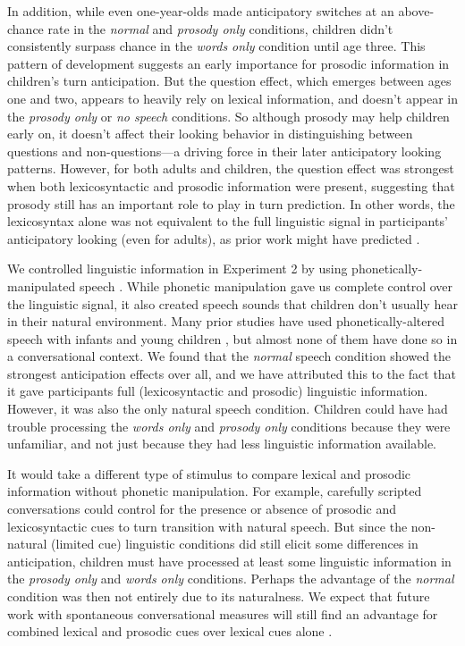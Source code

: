 \documentclass[authoryear, 12pt]{elsarticle}
\begin{document}
In addition, while even one-year-olds made anticipatory switches at an above-chance rate in the \textit{normal} and \textit{prosody only} conditions, children didn't consistently surpass chance in the \textit{words only} condition until age three. This pattern of development suggests an early importance for prosodic information in children's turn anticipation. But the question effect, which emerges between ages one and two, appears to heavily rely on lexical information, and doesn't appear in the \textit{prosody only} or \textit{no speech} conditions. So although prosody may help children early on, it doesn't affect their looking behavior in distinguishing between questions and non-questions---a driving force in their later anticipatory looking patterns. However, for both adults and children, the question effect was strongest when both lexicosyntactic and prosodic information were present, suggesting that prosody still has an important role to play in turn prediction. In other words, the lexicosyntax alone was not equivalent to the full linguistic signal in participants' anticipatory looking (even for adults), as prior work might have predicted \citep{de-ruiter2006, magyari2012}.

We controlled linguistic information in Experiment 2 by using phonetically-manipulated speech \citep{de-ruiter2006}. While phonetic manipulation gave us complete control over the linguistic signal, it also created speech sounds that children don't usually hear in their natural environment. Many prior studies have used phonetically-altered speech with infants and young children \citep[cf.][]{jusczyk2000}, but almost none of them have done so in a conversational context. We found that the \textit{normal} speech condition showed the strongest anticipation effects over all, and we have attributed this to the fact that it gave participants full (lexicosyntactic and prosodic) linguistic information. However, it was also the only natural speech condition. Children could have had trouble processing the \textit{words only} and \textit{prosody only} conditions because they were unfamiliar, and not just because they had less linguistic information available. 

It would take a different type of stimulus to compare lexical and prosodic information without phonetic manipulation. For example, carefully scripted conversations could control for the presence or absence of prosodic and lexicosyntactic cues to turn transition with natural speech. But since the non-natural (limited cue) linguistic conditions did still elicit some differences in anticipation, children must have processed at least some linguistic information in the \textit{prosody only} and \textit{words only} conditions. Perhaps the advantage of the \textit{normal} condition was then not entirely due to its naturalness. We expect that future work with spontaneous conversational measures will still find an advantage for combined lexical and prosodic cues over lexical cues alone \citep[see also][]{duncan1972, ford1996, bogelsUndRev}.
\end{document}
